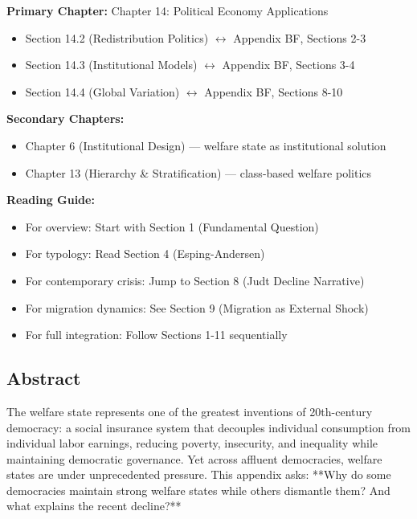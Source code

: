 \begin{tcolorbox}[colback=purple!5!white, colframe=purple!75!black,
    title=Chapter Linkage]

\textbf{Primary Chapter:} Chapter 14: Political Economy Applications
\begin{itemize}[nosep]
\item Section 14.2 (Redistribution Politics) $\leftrightarrow$ Appendix BF, Sections 2-3
\item Section 14.3 (Institutional Models) $\leftrightarrow$ Appendix BF, Sections 3-4
\item Section 14.4 (Global Variation) $\leftrightarrow$ Appendix BF, Sections 8-10
\end{itemize}

\textbf{Secondary Chapters:}
\begin{itemize}[nosep]
\item Chapter 6 (Institutional Design) --- welfare state as institutional solution
\item Chapter 13 (Hierarchy \& Stratification) --- class-based welfare politics
\end{itemize}

\textbf{Reading Guide:}
\begin{itemize}[nosep]
\item For overview: Start with Section 1 (Fundamental Question)
\item For typology: Read Section 4 (Esping-Andersen)
\item For contemporary crisis: Jump to Section 8 (Judt Decline Narrative)
\item For migration dynamics: See Section 9 (Migration as External Shock)
\item For full integration: Follow Sections 1-11 sequentially
\end{itemize}

\end{tcolorbox}

\clearpage


\subsection*{Abstract}

The welfare state represents one of the greatest inventions of 20th-century democracy: a social insurance system that decouples individual consumption from individual labor earnings, reducing poverty, insecurity, and inequality while maintaining democratic governance. Yet across affluent democracies, welfare states are under unprecedented pressure. This appendix asks: **Why do some democracies maintain strong welfare states while others dismantle them? And what explains the recent decline?**

